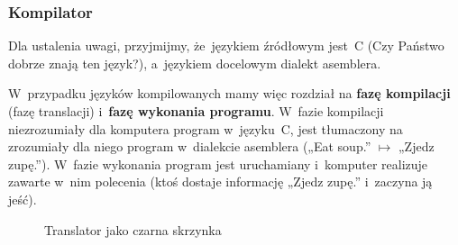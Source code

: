 \documentclass[10pt,t]{beamer}
\begin{document}
\begin{frame}
  \frametitle{Kompilator}


  Dla ustalenia uwagi, przyjmijmy, że~językiem źródłowym jest~C
  (Czy Państwo dobrze znają ten język?), a~językiem docelowym dialekt
  asemblera.

  W~przypadku języków kompilowanych mamy więc rozdział na \textbf{fazę
    kompilacji} (fazę translacji) i~\textbf{fazę wykonania programu}.
  W~fazie kompilacji niezrozumiały dla komputera program w~języku~C,
  jest tłumaczony na zrozumiały dla niego program w~dialekcie asemblera
  („Eat soup.” $\mapsto$ „Zjedz zupę.”). W~fazie wykonania program jest
  uruchamiany i~komputer realizuje zawarte w~nim polecenia (ktoś dostaje
  informację „Zjedz zupę.” i~zaczyna ją jeść).





  \begin{figure}

    \label{fig:Translator-04}



    \caption{Translator jako czarna skrzynka}


  \end{figure}

\end{frame}
\end{document}
